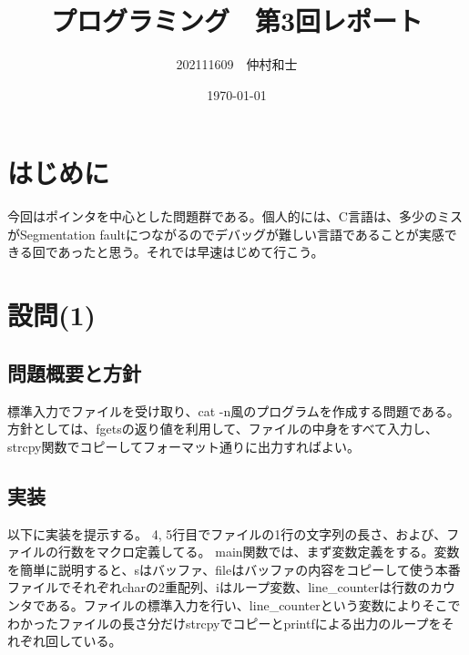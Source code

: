 \documentclass[dvipdfmx,12pt,a4j]{jarticle}
\title{プログラミング　第3回レポート}
\author{202111609　仲村和士}
\date{\today}
\begin{document}
\maketitle

\section{はじめに}
今回はポインタを中心とした問題群である。個人的には、C言語は、多少のミスがSegmentation faultにつながるのでデバッグが難しい言語であることが実感できる回であったと思う。それでは早速はじめて行こう。

\section{設問(1)}
\subsection{問題概要と方針}
標準入力でファイルを受け取り、cat -n風のプログラムを作成する問題である。方針としては、fgetsの返り値を利用して、ファイルの中身をすべて入力し、strcpy関数でコピーしてフォーマット通りに出力すればよい。

\subsection{実装}
以下に実装を提示する。
4, 5行目でファイルの1行の文字列の長さ、および、ファイルの行数をマクロ定義してる。
main関数では、まず変数定義をする。変数を簡単に説明すると、sはバッファ、fileはバッファの内容をコピーして使う本番ファイルでそれぞれcharの2重配列、iはループ変数、line\_counterは行数のカウンタである。ファイルの標準入力を行い、line\_counterという変数によりそこでわかったファイルの長さ分だけstrcpyでコピーとprintfによる出力のループをそれぞれ回している。

\end{document}
